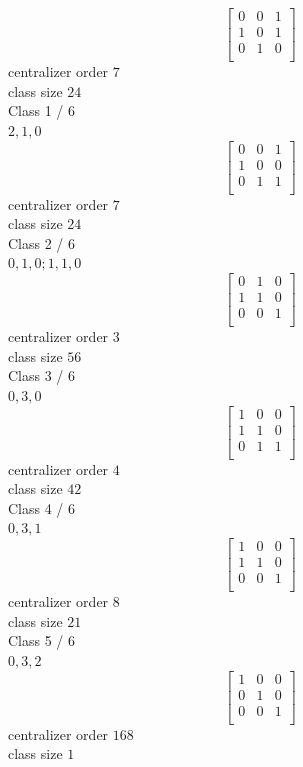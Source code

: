 $$
\left[
\begin{array}{*{3}{r}}
         0 &          0 &          1\\
         1 &          0 &          1\\
         0 &          1 &          0\\
\end{array}
\right]$$
centralizer order $7$\\class size $24$\\
Class 1 / 6\\
$2,1,0$
$$
\left[
\begin{array}{*{3}{r}}
         0 &          0 &          1\\
         1 &          0 &          0\\
         0 &          1 &          1\\
\end{array}
\right]$$
centralizer order $7$\\class size $24$\\
Class 2 / 6\\
$0,1,0;1,1,0$
$$
\left[
\begin{array}{*{3}{r}}
         0 &          1 &          0\\
         1 &          1 &          0\\
         0 &          0 &          1\\
\end{array}
\right]$$
centralizer order $3$\\class size $56$\\
Class 3 / 6\\
$0,3,0$
$$
\left[
\begin{array}{*{3}{r}}
         1 &          0 &          0\\
         1 &          1 &          0\\
         0 &          1 &          1\\
\end{array}
\right]$$
centralizer order $4$\\class size $42$\\
Class 4 / 6\\
$0,3,1$
$$
\left[
\begin{array}{*{3}{r}}
         1 &          0 &          0\\
         1 &          1 &          0\\
         0 &          0 &          1\\
\end{array}
\right]$$
centralizer order $8$\\class size $21$\\
Class 5 / 6\\
$0,3,2$
$$
\left[
\begin{array}{*{3}{r}}
         1 &          0 &          0\\
         0 &          1 &          0\\
         0 &          0 &          1\\
\end{array}
\right]$$
centralizer order $168$\\class size $1$\\
